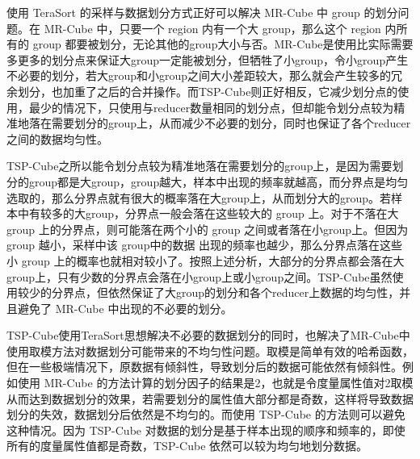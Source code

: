 



使用 TeraSort 的采样与数据划分方式正好可以解决 MR-Cube 中 group 的划分问题。在 MR-Cube 中，只要一个 region 内有一个大 group，那么这个 region 内所有的 group 都要被划分，无论其他的group大小与否。MR-Cube是使用比实际需要多更多的划分点来保证大group一定能被划分，但牺牲了小group，令小group产生不必要的划分，若大group和小group之间大小差距较大，那么就会产生较多的冗余划分，也加重了之后的合并操作。而TSP-Cube则正好相反，它减少划分点的使用，最少的情况下，只使用与reducer数量相同的划分点，但却能令划分点较为精准地落在需要划分的group上，从而减少不必要的划分，同时也保证了各个reducer之间的数据均匀性。

TSP-Cube之所以能令划分点较为精准地落在需要划分的group上，是因为需要划分的group都是大group，group越大，样本中出现的频率就越高，而分界点是均匀选取的，那么分界点就有很大的概率落在大group上，从而划分大的group。若样本中有较多的大group，分界点一般会落在这些较大的 group 上。对于不落在大 group 上的分界点，则可能落在两个小的 group 之间或者落在小group上。但因为 group 越小，采样中该 group中的数据 出现的频率也越少，那么分界点落在这些小 group 上的概率也就相对较小了。按照上述分析，大部分的分界点都会落在大group上，只有少数的分界点会落在小group上或小group之间。TSP-Cube虽然使用较少的分界点，但依然保证了大group的划分和各个reducer上数据的均匀性，并且避免了 MR-Cube 中出现的不必要的划分。

TSP-Cube使用TeraSort思想解决不必要的数据划分的同时，也解决了MR-Cube中使用取模方法对数据划分可能带来的不均匀性问题。取模是简单有效的哈希函数，但在一些极端情况下，原数据有倾斜性，导致划分后的数据可能依然有倾斜性。例如使用 MR-Cube 的方法计算的划分因子的结果是2，也就是令度量属性值对2取模从而达到数据划分的效果，若需要划分的属性值大部分都是奇数，这样将导致数据划分的失效，数据划分后依然是不均匀的。而使用 TSP-Cube 的方法则可以避免这种情况。因为 TSP-Cube 对数据的划分是基于样本出现的顺序和频率的，即使所有的度量属性值都是奇数，TSP-Cube 依然可以较为均匀地划分数据。


